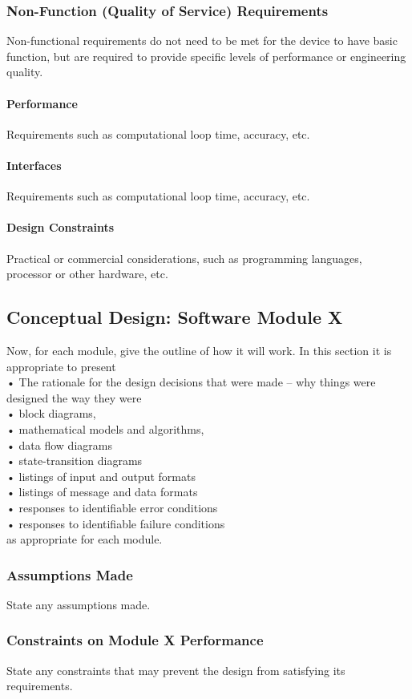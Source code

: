 \documentclass[11pt,a4paper]{article}
\begin{document}
\subsubsection{Non-Function (Quality of Service) Requirements}
Non-functional requirements do not need to be met for the device to have basic function, but are required to provide specific levels of performance or engineering quality.
\paragraph{Performance}
Requirements such as computational loop time, accuracy, etc.
\paragraph{Interfaces}
Requirements such as computational loop time, accuracy, etc.
\paragraph{Design Constraints}
Practical or commercial considerations, such as programming languages, processor or other hardware, etc.
\subsection{Conceptual Design: Software Module X}
Now, for each module, give the outline of how it will work. In this section it is appropriate to present \\
•	The rationale for the design decisions that were made – why things were designed the way they were\\
•	block diagrams,\\
•	mathematical models and algorithms,\\
•	data flow diagrams\\
•	state-transition diagrams\\
•	listings of input and output formats\\
•	listings of message and data formats\\
•	responses to identifiable error conditions\\
•	responses to identifiable failure conditions\\
as appropriate for each module.

\subsubsection{Assumptions Made}
State any assumptions made.
\subsubsection{Constraints on Module X Performance}
State any constraints that may prevent the design from satisfying its requirements.
\end{document}
